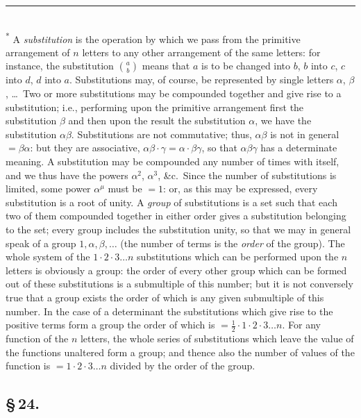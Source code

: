 \documentclass[11pt,a4paper]{article}
\begin{document}
\smallskip
\small\noindent\rule{0.4\textwidth}{0.4pt}\\
\textsuperscript{*} A \textit{substitution} is the operation by which we pass from the primitive arrangement of $n$ letters to any other arrangement of the same letters: for instance, the substitution $\binom{a}{b}$ means that $a$ is to be changed into $b$, $b$ into $c$, $c$ into $d$, $d$ into $a$. Substitutions may, of course, be represented by single letters $\alpha$, $\beta$, \ldots\ Two or more substitutions may be compounded together and give rise to a substitution; i.e., performing upon the primitive arrangement first the substitution $\beta$ and then upon the result the substitution $\alpha$, we have the substitution $\alpha\beta$. Substitutions are not commutative; thus, $\alpha\beta$ is not in general $= \beta\alpha$: but they are associative, $\alpha\beta \cdot \gamma = \alpha \cdot \beta\gamma$, so that $\alpha\beta\gamma$ has a determinate meaning. A substitution may be compounded any number of times with itself, and we thus have the powers $\alpha^{2}$, $\alpha^{3}$, \&c.\ Since the number of substitutions is limited, some power $\alpha^{\mu}$ must be $=1$: or, as this may be expressed, every substitution is a root of unity. A \textit{group} of substitutions is a set such that each two of them compounded together in either order gives a substitution belonging to the set; every group includes the substitution unity, so that we may in general speak of a group $1, \alpha, \beta, \ldots$ (the number of terms is the \textit{order} of the group). The whole system of the $1 \cdot 2 \cdot 3 \ldots n$ substitutions which can be performed upon the $n$ letters is obviously a group: the order of every other group which can be formed out of these substitutions is a submultiple of this number; but it is not conversely true that a group exists the order of which is any given submultiple of this number. In the case of a determinant the substitutions which give rise to the positive terms form a group the order of which is $= \frac{1}{2} \cdot 1 \cdot 2 \cdot 3 \ldots n$. For any function of the $n$ letters, the whole series of substitutions which leave the value of the functions unaltered form a group; and thence also the number of values of the function is $= 1 \cdot 2 \cdot 3 \ldots n$ divided by the order of the group.
\normalsize

\subsection*{\S\,24.}
\end{document}
